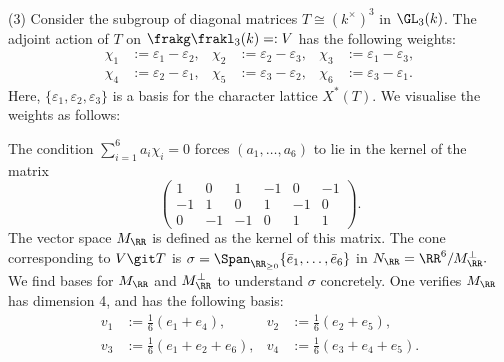\documentclass[12pt]{amsart}
\theoremstyle{plain}
\theoremstyle{definition}
\begin{document}
(3)
Consider the subgroup of diagonal matrices $T \cong (k^\times)^3$ in $\GL_3(k)$.
The adjoint action of $T$ on $\frakg\frakl_3(k) =: V$ has the following weights:
\begin{align*}
	\chi_1 &:= \varepsilon_1 - \varepsilon_2, & \chi_2 &:= \varepsilon_2 - \varepsilon_3, & \chi_3 &:= \varepsilon_1 - \varepsilon_3, \\
	\chi_4 &:= \varepsilon_2 - \varepsilon_1, & \chi_5 &:= \varepsilon_3 - \varepsilon_2, & \chi_6 &:= \varepsilon_3 - \varepsilon_1.
\end{align*}
Here, $\{\varepsilon_1, \varepsilon_2, \varepsilon_3\}$ is a basis for the character lattice $X^*(T)$.
We visualise the weights as follows:
\begin{center}
\end{center}
\noindent
The condition $\sum_{i=1}^6 a_i \chi_i = 0$ forces $(a_1, \ldots, a_6)$ to lie in the kernel of the matrix
$$
\begin{pmatrix}
	1 & 0 & 1 & -1 & 0 & -1 \\
	-1 & 1 & 0 & 1 & -1 & 0 \\
	0 & -1 & -1 & 0 & 1 & 1
\end{pmatrix}.
$$
The vector space $M_\RR$ is defined as the kernel of this matrix.
The cone corresponding to $V \git T$ is $\sigma = \Span_{\RR_{\ge 0}}\{\bar e_1, \ldots, \bar e_6\}$ in $N_\RR = \RR^6 / M_\RR^\perp.$
We find bases for $M_\RR$ and $M_\RR^\perp$ to understand $\sigma$ concretely.
One verifies $M_\RR$ has dimension 4, and has the following basis:
\begin{align*}
	v_1 &:= \frac{1}{6} (e_1+e_4), & v_2 &:= \frac{1}{6}(e_2+e_5), \\
	v_3 &:= \frac{1}{6}(e_1+e_2+e_6), & v_4 &:= \frac{1}{6}(e_3+e_4+e_5).
\end{align*}
\end{document}
